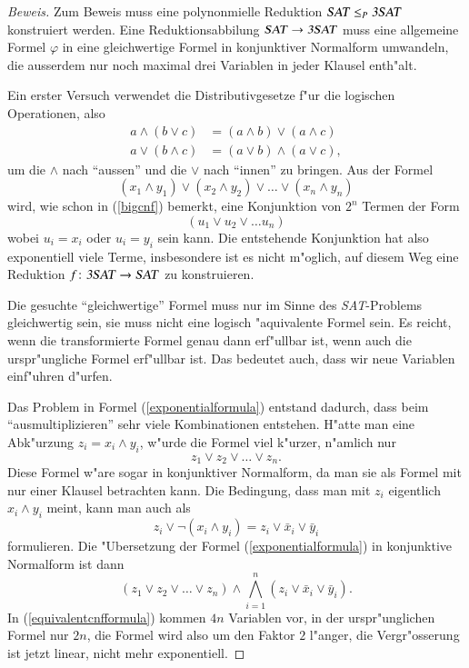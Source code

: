 \begin{proof}[Beweis]
Zum Beweis muss eine polynonmielle Reduktion
$\text{\textsl{SAT}}\le_P\text{\textsl{3SAT}}$ konstruiert werden.
Eine Reduktionsabbilung
$\text{\textsl{SAT}}\to\text{\textsl{3SAT}}$ muss eine allgemeine Formel
$\varphi$ in eine gleichwertige Formel in konjunktiver Normalform umwandeln, 
die ausserdem nur noch maximal drei Variablen in jeder Klausel enth"alt.

Ein erster Versuch verwendet die Distributivgesetze f"ur die 
logischen Operationen, also
\begin{align*}
a\wedge(b\vee c)&=(a\wedge b)\vee(a\wedge c)\\
a\vee(b\wedge c)&=(a\vee b)\wedge(a\vee c),
\end{align*}
um die $\wedge$ nach ``aussen'' und die $\vee$ nach ``innen'' zu
bringen. Aus der Formel 
\begin{equation}
(x_1\wedge y_1)
\vee
(x_2\wedge y_2)
\vee
\dots
\vee
(x_n\wedge y_n)
\label{exponentialformula}
\end{equation}
wird, wie schon in (\ref{bigcnf}) bemerkt, eine Konjunktion von $2^n$
Termen der Form
\[
(u_1\vee u_2\vee \dots u_n)
\]
wobei $u_i=x_i$ oder $u_i=y_i$ sein kann. 
Die entstehende Konjunktion hat also exponentiell viele Terme, insbesondere
ist es nicht m"oglich, auf diesem Weg eine Reduktion
$f\colon\text{\textsl{3SAT}}\to\text{\textsl{SAT}}$ zu konstruieren.

Die gesuchte ``gleichwertige'' Formel muss nur im Sinne des
\textsl{SAT}-Problems gleichwertig sein, sie muss nicht eine
logisch "aquivalente Formel sein. Es reicht, wenn die transformierte
Formel genau dann erf"ullbar ist, wenn auch die urspr"ungliche Formel
erf"ullbar ist. Das bedeutet auch, dass wir neue Variablen einf"uhren
d"urfen.

Das Problem in Formel (\ref{exponentialformula}) entstand dadurch, dass
beim ``ausmultiplizieren'' sehr viele Kombinationen entstehen. H"atte
man eine Abk"urzung $z_i=x_i\wedge y_i$, w"urde die Formel viel
k"urzer, n"amlich nur
\[
z_1\vee z_2\vee\dots\vee z_n.
\]
Diese Formel w"are sogar in konjunktiver Normalform, da man sie
als Formel mit nur einer Klausel betrachten kann.
Die Bedingung, dass man mit $z_i$ eigentlich $x_i\wedge y_i$ 
meint, kann man auch als 
\[
z_i\vee \neg(x_i\wedge y_i)
=
z_i\vee \bar x_i\vee\bar y_i
\]
formulieren. Die "Ubersetzung der Formel (\ref{exponentialformula})
in konjunktive Normalform ist dann
\begin{equation}
(z_1\vee z_2\vee\dots\vee z_n)
\wedge
\bigwedge_{i=1}^n (z_i\vee \bar x_i\vee\bar y_i).
\label{equivalentcnfformula}
\end{equation}
In (\ref{equivalentcnfformula}) kommen $4n$ Variablen vor,
in der urspr"unglichen Formel
nur $2n$, die Formel wird also um den Faktor $2$ l"anger, die
Vergr"osserung ist jetzt linear, nicht mehr exponentiell.


\end{proof}
